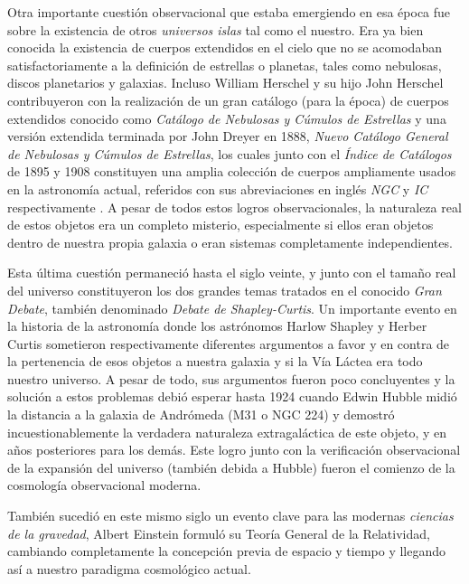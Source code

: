 Otra importante cuestión observacional que estaba emergiendo en esa época
fue sobre la existencia de otros \textit{universos islas} tal como el nuestro.
Era ya bien conocida la existencia de cuerpos extendidos en el cielo que no
se acomodaban satisfactoriamente a la definición de estrellas o planetas,
tales como nebulosas, discos planetarios y galaxias. Incluso William Herschel
y su hijo John Herschel contribuyeron con la realización de un gran catálogo
(para la época) de cuerpos extendidos conocido como \textit{Catálogo de 
Nebulosas y Cúmulos de Estrellas} y una versión extendida terminada por
John Dreyer en 1888, \textit{Nuevo Catálogo General de Nebulosas y Cúmulos
de Estrellas}, los cuales junto con el \textit{Índice de Catálogos} de 
1895 y 1908 constituyen una amplia colección de cuerpos ampliamente usados
en la astronomía actual, referidos con sus abreviaciones en inglés \textit{NGC}
y \textit{IC} respectivamente \cite{longair2008}. A pesar de todos estos
logros observacionales, la naturaleza real de estos objetos era un completo 
misterio, especialmente si ellos eran objetos dentro de nuestra propia 
galaxia o eran sistemas completamente independientes.


Esta última cuestión permaneció hasta el siglo veinte, y junto con el tamaño
real del universo constituyeron los dos grandes temas tratados en el 
conocido \textit{Gran Debate}, también denominado \textit{Debate de 
Shapley-Curtis}. Un importante evento en la historia de la astronomía donde
los astrónomos Harlow Shapley y Herber Curtis sometieron respectivamente 
diferentes argumentos a favor y en contra de la pertenencia de esos objetos
a nuestra galaxia y si la Vía Láctea era todo nuestro universo. A pesar de 
todo, sus argumentos fueron poco concluyentes y la solución a estos 
problemas debió esperar hasta 1924 cuando Edwin Hubble midió la distancia
a la galaxia de Andrómeda (M31 o NGC 224) y demostró incuestionablemente 
la verdadera naturaleza extragaláctica de este objeto, y en años posteriores
para los demás. Este logro junto con la verificación observacional de la 
expansión del universo (también debida a Hubble) fueron el comienzo de la 
cosmología observacional moderna.


También sucedió en este mismo siglo un evento clave para las modernas 
\textit{ciencias de la gravedad}, Albert Einstein formuló su Teoría
General de la Relatividad, cambiando completamente la concepción previa
de espacio y tiempo y llegando así a nuestro paradigma cosmológico actual.






